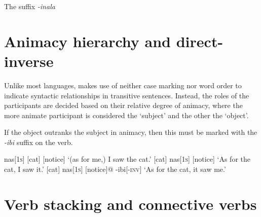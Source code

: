The suffix \textit{-inala} 

\section{Animacy hierarchy and direct-inverse}

Unlike most languages, \lang{} makes use of neither case marking nor word order to indicate syntactic relationships in transitive sentences. Instead, the roles of the participants are decided based on their relative degree of animacy, where the more animate participant is considered the `subject' and the other the `object'. 


If the object outranks the subject in animacy, then this must be marked with the \textit{-ibi} suffix on the verb.

\pex
\a\begingl
\glpreamble
{}
\endpreamble
nas[\textsc{1s}]
[cat]
[notice]
\glft `(as for me,) I saw the cat.'
\endgl
\a\begingl
\glpreamble
{}
\endpreamble
{}[cat]
nas[\textsc{1s}]
[notice]
\glft `As for the cat, I saw it.'
\endgl
\a\begingl
\glpreamble
{}
\endpreamble
{}[cat]
nas[\textsc{1s}]
[notice]@
-ibi[\textsc{-inv}]
\glft `As for the cat, it saw me.'
\endgl
\xe

\section{Verb stacking and connective verbs}

